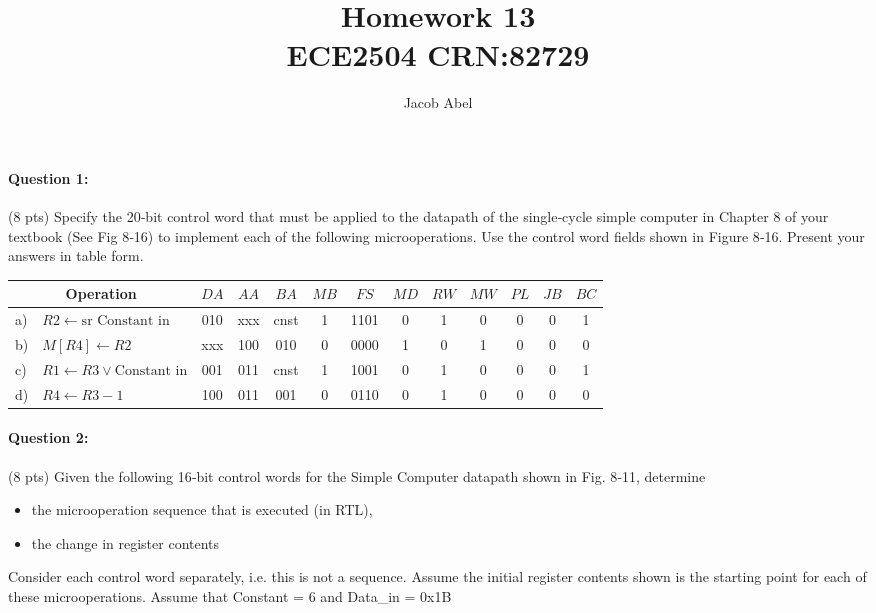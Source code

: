 \documentclass[12pt,letterpaper,titlepage]{report}
\author{Jacob Abel}
\title{%
	Homework 13
	\\\large ECE2504 CRN:82729
}
\begin{document}
\maketitle
\begin{raggedright}
\raggedcolumns

\paragraph{Question 1:}
(8 pts) Specify the 20‐bit control word that must be applied to the datapath of the single‐cycle simple computer in Chapter 8 of your textbook (See Fig 8‐16) to implement each of the following microoperations. Use the control word fields shown in Figure 8‐16. Present your answers in table form.
\begin{center}
\def\arraystretch{1.5}
\begin{tabular}{|ll|c|c|c|c|c|c|c|c|c|c|c|}\hline
\multicolumn{2}{|c|}{Operation}            &$DA$&$AA$&$BA$&$MB$&$FS$&$MD$&$RW$&$MW$&$PL$&$JB$&$BC$\\ \hline\hline
a) & $R2 \gets \text{sr Constant in}$      &010 &xxx &cnst& 1  &1101& 0  & 1  & 0  & 0  & 0  & 1  \\ \hline
b) & $M[R4] \gets R2$                      &xxx &100 &010 & 0  &0000& 1  & 0  & 1  & 0  & 0  & 0  \\ \hline
c) & $R1 \gets R3 \lor \text{Constant in}$ &001 &011 &cnst& 1  &1001& 0  & 1  & 0  & 0  & 0  & 1  \\ \hline
d) & $R4 \gets R3 - 1$                     &100 &011 &001 & 0  &0110& 0  & 1  & 0  & 0  & 0  & 0  \\ \hline
\end{tabular}
\end{center}

\clearpage

\paragraph{Question 2:}
(8 pts) Given the following 16‐bit control words for the Simple Computer datapath shown in Fig. 8‐11, determine
\begin{itemize}[noitemsep]
\item the microoperation sequence that is executed (in RTL),
\item the change in register contents
\end{itemize}

Consider each control word separately, i.e. this is not a sequence. Assume the initial register contents shown is the starting point for each of these microoperations. Assume that Constant = 6 and Data\_in = 0x1B



\end{raggedright}
\end{document}
